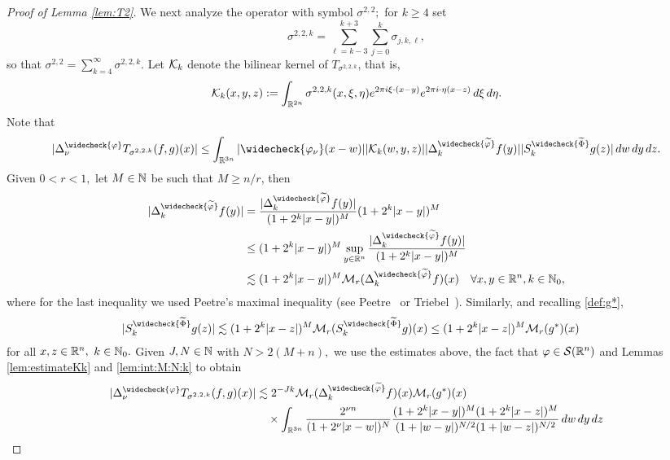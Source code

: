 \begin{proof}[Proof of Lemma \ref{lem:T2}]
We next analyze the operator with  symbol $\sigma^{2,2};$ for $k \geq 4$ set 
\begin{equation*}
\sigma^{2,2,k}  = \sum\limits_{\ell =k-3}^{k+3} \sum\limits_{j=0}^k \sigma_{j,k,\ell},
\end{equation*}
so that $\sigma^{2,2} = \sum\limits_{k=4}^\infty \sigma^{2,2,k}.$ 
 Let $\mathcal{K}_k$ denote the bilinear kernel of  $T_{\sigma^{2,2,k}}$, that is,
$$
\mathcal{K}_k(x,y,z):= \int_{\mathbb{R}^{2n}} \sigma^{2,2,k}(x, \xi, \eta) e^{2\pi i \xi \cdot( x- y)} e^{2\pi i \cdot \eta (x-z)} \, d\xi \, d\eta.
$$
Note that
\begin{align*}
| \Delta^{\widecheck{\f}}_\nu T_{\sigma^{2,2,k}}(f,g)(x)| \leq \int_{\re^{3n}} |\widecheck{\f_\nu}(x- w)| |\K_k(w, y, z)| |\Delta^{\widecheck{\widetilde{\f}}}_k f(y)| |S^{\widecheck{\widetilde{\Phi}}}_k g(z)| \, dw \dy \dz.
\end{align*}
Given $0<r <1,$  let $M \in \mathbb{N}$ be such that $M \geq n/r$, then
\begin{align*}
|\Delta^{\widecheck{\widetilde{\f}}}_k f(y)|&  = \frac{|\Delta^{\widecheck{\widetilde{\f}}}_k f(y)|}{(1 + 2^k |x-y|)^M} (1 + 2^k |x-y|)^M\\
& \leq  (1 + 2^k |x-y|)^M \sup_{y\in\rn} \frac{|\Delta^{\widecheck{\widetilde{\f}}}_k f(y)|}{(1 + 2^k |x-y|)^M} \\
& \lesssim (1 + 2^k |x-y|)^M \mathcal{M}_r(\Delta^{\widecheck{\widetilde{\f}}}_k f)(x)\quad\forall x,y\in\rn,k\in\na_0,
\end{align*}
where for the last inequality we used Peetre's maximal inequality (see Peetre~\cite{MR0380394} or Triebel~\cite[p.16, Theorem 1.3.1]{MR3024598}). Similarly, and recalling \eqref{def:g*},
\begin{align*}
|S^{\widecheck{\widetilde{\Phi}}}_k g(z)| & \lesssim (1 + 2^k |x-z|)^M \mathcal{M}_r(S^{\widecheck{\widetilde{\Phi}}}_k g)(x)  \leq (1 + 2^k |x-z|)^M \mathcal{M}_r(g^*)(x)
\end{align*}
for all $ x,z\in{{\mathbb R}^n},$ $k\in\mathbb{N}_0.$
Given $J, N \in \mathbb{N}$ with $N>2(M+n),$  we use the estimates above, the fact that $\varphi\in{\mathcal{S}}({{\mathbb R}^n})$ and Lemmas \ref{lem:estimateKk} and  \ref{lem:int:M:N:k} to obtain 
\begin{align*}
 |\Delta^{\widecheck{\f}}_\nu T_{\sigma^{2,2,k}}(f,g)(x)| &\lesssim 2^{-Jk} \mathcal{M}_r(\Delta^{\widecheck{\widetilde{\f}}}_k f)(x) \mathcal{M}_r(g^*)(x)\\
 &\quad\times \int_{\re^{3n}} \frac{2^{\nu n}}{(1+ 2^\nu |x- w|)^N} \frac{(1 + 2^k |x-y|)^M (1 + 2^k |x-z|)^M}{(1+ |w-y|)^{N/2} (1+ |w-z|)^{N/2}} \, dw \dy \dz\\

\end{align*}
\end{proof}
